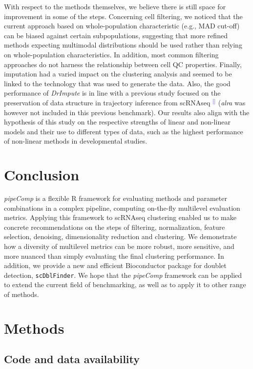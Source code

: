 \documentclass[11pt]{article}
\renewcommand{\cite}[1]{\textcolor{Blue}{$^[$\supercite{#1}$^]$}}
\begin{document}
With respect to the methods themselves, we believe there is still space for improvement in some of the steps. Concerning cell filtering, we noticed that the current approach based on whole-population characteristic (e.g., MAD cut-off) can be biased against certain subpopulations, suggesting that more refined methods expecting multimodal distributions should be used rather than relying on whole-population characteristics. In addition, most common filtering approaches do not harness the relationship between cell QC properties. Finally, imputation had a varied impact on the clustering analysis and seemed to be linked to the technology that was used to generate the data. Also, the good performance of \textit{DrImpute} is in line with a previous study focused on the preservation of data structure in trajectory inference from scRNAseq \cite{ZhangImput2018} (\textit{alra} was however not included in this previous benchmark). Our results also align with the hypothesis of this study on the respective strengths of linear and non-linear models and their use to different types of data, such as the highest performance of non-linear methods in developmental studies. 

\section*{Conclusion}

\textit{pipeComp} is a flexible R framework for evaluating methods and parameter combinations in a complex pipeline, computing on-the-fly multilevel evaluation metrics. Applying this framework to scRNAseq clustering enabled us to make concrete recommendations on the steps of filtering, normalization, feature selection, denoising, dimensionality reduction and clustering. We demonstrate how a diversity of multilevel metrics can be more robust, more sensitive, and more nuanced than simply evaluating the final clustering performance. In addition, we provide a new and efficient Bioconductor package for doublet detection, \texttt{scDblFinder}. We hope that the \textit{pipeComp} framework can be applied to extend the current field of benchmarking, as well as to apply it to other range of methods.

\newpage

\section*{Methods}

\subsection*{Code and data availability}
\end{document}
